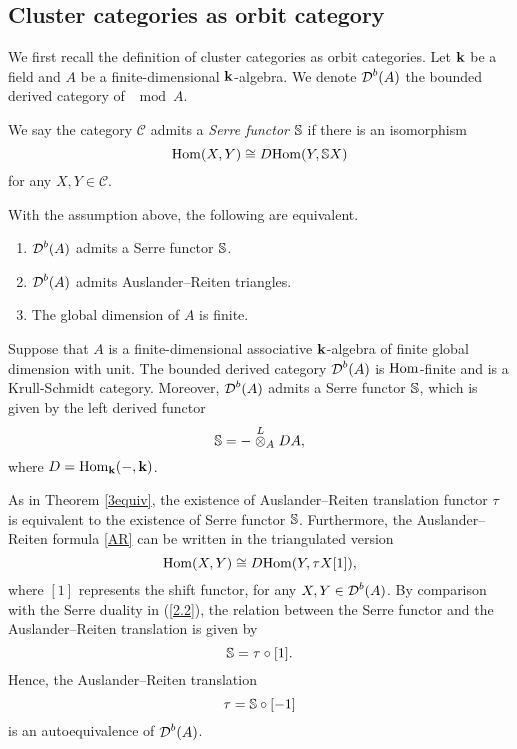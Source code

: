 \subsection{Cluster categories as orbit category}
We first recall the definition of cluster categories as orbit categories.
Let $\mathbf{k}$ be a field and $A$ be a finite-dimensional $\mathbf{k}$-algebra.
We denote $\operatorname{\mathcal{D}}^b(A)$ the bounded derived category of $\mod A$. \label{sec 2.4}
\begin{definition}
  We say the category $\mathcal{C}$ admits a \textit{Serre functor} $\mathbb{S}$
  if there is an isomorphism
  \begin{equation}\label{2.2}
    \operatorname{Hom}(X, Y) \cong \operatorname{\mathnormal{D}Hom}(Y, \mathbb{S} X)
  \end{equation}
  for any $X, Y \in \mathcal{C}$.
\end{definition}

\begin{theorem}\cite[Theorem 3.1]{K1}\label{3equiv}
  With the assumption above, the following are equivalent.
  \begin{enumerate}
    \item $\operatorname{\mathcal{D}}^b(A)$ admits a Serre functor $\mathbb{S}$.
    \item $\operatorname{\mathcal{D}}^b(A)$ admits Auslander--Reiten triangles.
    \item The global dimension of $A$ is finite.
  \end{enumerate}
\end{theorem}
Suppose that $A$ is a finite-dimensional associative $\mathbf{k}$-algebra
of finite global dimension with unit.
The bounded derived category $\operatorname{\mathcal{D}}^b(A)$ is $\operatorname{Hom}$-finite
and is a Krull-Schmidt category.
Moreover, $\operatorname{\mathcal{D}}^b(A)$ admits a Serre functor $\mathbb{S}$,
which is given by the left derived functor \cite{K1}
\[ \mathbb{S} = - \stackrel{L}{\otimes}_A DA, \]
where $D = \operatorname{Hom}_{\mathbf{k}}(-, \mathbf{k})$.

As in Theorem \ref{3equiv},
the existence of Auslander--Reiten translation functor $\tau$
is equivalent to the existence of Serre functor $\mathbb{S}$.
Furthermore, the Auslander--Reiten formula \eqref{AR}
can be written in the triangulated version
\begin{equation}\label{2.3}
  \Hom(X, Y) %
  \cong \DHom(Y,\tau X[1]),
\end{equation}
where $[1]$ represents the shift functor, for any $X, Y \in \operatorname{\mathcal{D}}^b(A)$.
By comparison with the Serre duality in (\ref{2.2}),
the relation between the Serre functor
and the Auslander--Reiten translation is given by
\begin{equation}\label{rea}
  \mathbb{S} = \tau \circ [1].
\end{equation}
Hence, the Auslander--Reiten translation
\begin{equation}\label{rela}
  \tau = \mathbb{S} \circ [-1]
\end{equation}
is an autoequivalence of $\operatorname{\mathcal{D}}^b(A)$.

